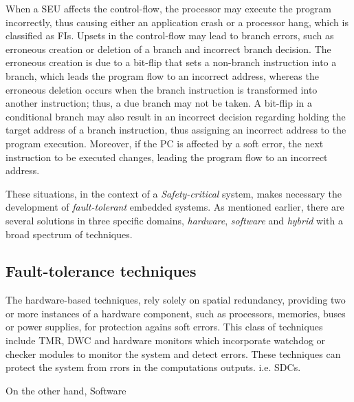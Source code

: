 \documentclass[10pt, a4paper]{report}
\begin{document}
When a \acrshort{SEU} affects the control-flow, the processor may execute the
program incorrectly, thus causing either an application crash or a processor
hang, which is classified as \acrshort{FI}s. Upsets in the control-flow may lead
to branch errors, such as erroneous creation or deletion of a branch and
incorrect branch decision. The erroneous creation is due to a bit-flip that sets
a non-branch instruction into a branch, which leads the program flow to an
incorrect address, whereas the erroneous deletion occurs when the branch
instruction is transformed into another instruction; thus, a due branch may not
be taken. A bit-flip in a conditional branch may also result in an incorrect
decision regarding holding the target address of a branch instruction, thus
assigning an incorrect address to the program execution. Moreover, if the
\acrfull{PC} is affected by a soft error, the next instruction to be executed
changes, leading the program flow to an incorrect address.

These situations, in the context of a \emph{Safety-critical} system, makes
necessary the development of \emph{fault-tolerant} embedded systems. As
mentioned earlier, there are several solutions in three specific domains,
\emph{hardware}, \emph{software} and \emph{hybrid} with a broad spectrum of
techniques.

\subsection{Fault-tolerance techniques}

The hardware-based techniques, rely solely on spatial redundancy, providing two
or more instances of a hardware component, such as processors, memories, buses
or power supplies, for protection agains soft errors. This class of techniques
include \acrfull{TMR}, \acrfull{DWC} and hardware monitors which incorporate
watchdog or checker modules to monitor the system and detect errors. These
techniques can protect the system from rrors in the computations outputs. i.e.
\acrshort{SDC}s.

On the other hand, Software
\end{document}
